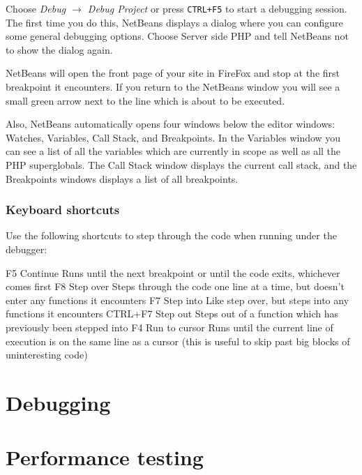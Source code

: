 \documentclass[draft,ebook,10pt,twoside,openright]{memoir}
\begin{document}
Choose \emph{Debug $\rightarrow$ Debug Project} or press \verb!CTRL+F5! to start a debugging session. The first time you do this, NetBeans displays a dialog where you can configure some general debugging options. Choose Server side PHP and tell NetBeans not to show the dialog again.

NetBeans will open the front page of your site in FireFox and stop at the first breakpoint it encounters. If you return to the NetBeans window you will see a small green arrow next to the line which is about to be executed.

Also, NetBeans automatically opens four windows below the editor windows: Watches, Variables, Call Stack, and Breakpoints. In the Variables window you can see a list of all the variables which are currently in scope as well as all the PHP superglobals. The Call Stack window displays the current call stack, and the Breakpoints windows displays a list of all breakpoints.

\subsection{Keyboard shortcuts}

Use the following shortcuts to step through the code when running under the debugger:

F5 	Continue 	Runs until the next breakpoint or until the code exits, whichever comes first
F8 	Step over 	Steps through the code one line at a time, but doesn’t enter any functions it encounters
F7 	Step into 	Like step over, but steps into any functions it encounters
CTRL+F7 	Step out 	Steps out of a function which has previously been stepped into
F4 	Run to cursor 	Runs until the current line of execution is on the same line as a cursor (this is useful to skip past big blocks of uninteresting code)

\chapter{Debugging} \label{chdebugging}

\chapter{Performance testing} \label{chperformance}
\end{document}
